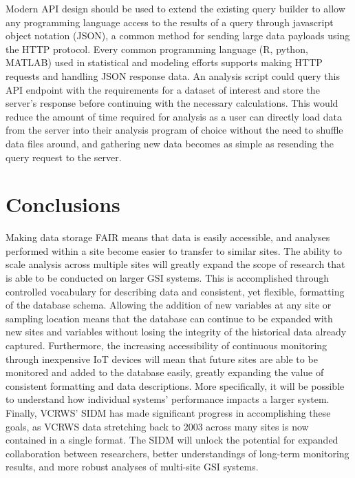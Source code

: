 Modern API design should be used to extend the existing query builder to allow any programming language access to the results of a query through javascript object notation (JSON), a common method for sending large data payloads using the HTTP protocol.
Every common programming language (R, python, MATLAB) used in statistical and modeling efforts supports making HTTP requests and handling JSON response data.
An analysis script could query this API endpoint with the requirements for a dataset of interest and store the server's response before continuing with the necessary calculations.
This would reduce the amount of time required for analysis as a user can directly load data from the server into their analysis program of choice without the need to shuffle data files around, and gathering new data becomes as simple as resending the query request to the server.

\section{Conclusions}

Making data storage FAIR means that data is easily accessible, and analyses performed within a site become easier to transfer to similar sites.
The ability to scale analysis across multiple sites will greatly expand the scope of research that is able to be conducted on larger GSI systems.
This is accomplished through controlled vocabulary for describing data and consistent, yet flexible, formatting of the database schema.
Allowing the addition of new variables at any site or sampling location means that the database can continue to be expanded with new sites and variables without losing the integrity of the historical data already captured.
Furthermore, the increasing accessibility of continuous monitoring through inexpensive IoT devices will mean that future sites are able to be monitored and added to the database easily, greatly expanding the value of consistent formatting and data descriptions.
More specifically, it will be possible to understand how individual systems' performance impacts a larger system.
Finally, VCRWS' SIDM has made significant progress in accomplishing these goals, as VCRWS data stretching back to 2003 across many sites is now contained in a single format.
The SIDM will unlock the potential for expanded collaboration between researchers, better understandings of long-term monitoring results, and more robust analyses of multi-site GSI systems.

